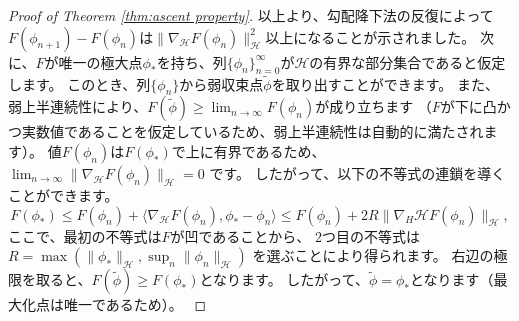 \documentclass{jsarticle}
\theoremstyle{definition}
\begin{document}
\begin{proof}[Proof of Theorem \ref{thm:ascent property}]
  以上より、勾配降下法の反復によって$F(\phi_{n+1}) - F(\phi_n)$は$\|\nabla_\mathcal{H} F(\phi_n)\|_\mathcal{H}^2$以上になることが示されました。
  {\color{teal}
  次に、$F$が唯一の極大点$\phi_*$を持ち、列$\{\phi_n\}_{n=0}^\infty$が$\mathcal{H}$の有界な部分集合であると仮定します。
  このとき、列$\{\phi_n\}$から弱収束点$\tilde{\phi}$を取り出すことができます。
  また、弱上半連続性により、$F(\tilde{\phi}) \geq \lim_{n \to \infty} F(\phi_n)$が成り立ちます
  （$F$が下に凸かつ実数値であることを仮定しているため、弱上半連続性は自動的に満たされます）。
  値$F(\phi_n)$は$F(\phi_*)$で上に有界であるため、
  $\lim_{n \to \infty} \|\nabla_\mathcal{H} F(\phi_n)\|_\mathcal{H} = 0$
  です。
  したがって、以下の不等式の連鎖を導くことができます。
  $$
    F(\phi_*) \leq F(\phi_n) + \langle \nabla_\mathcal{H} F(\phi_n), \phi_* - \phi_n \rangle \leq F(\phi_n) + 2R \|\nabla_H\mathcal{H} F(\phi_n)\|_\mathcal{H},
  $$
  ここで、最初の不等式は$F$が凹であることから、
  2つ目の不等式は
  $R = \max(\|\phi_*\|_\mathcal{H}, \sup_n \|\phi_n\|_\mathcal{H})$
  を選ぶことにより得られます。
  右辺の極限を取ると、$F(\tilde{\phi}) \geq F(\phi_*)$となります。
  したがって、$\tilde{\phi} = \phi_*$となります（最大化点は唯一であるため）。
  }
\end{proof}
\end{document}
